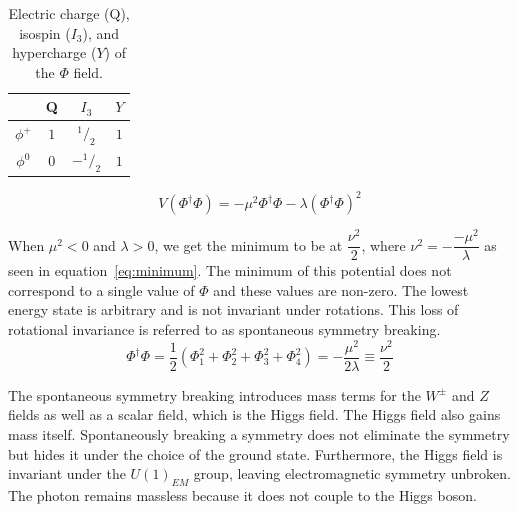 \begin{center}
\begin{table}[htb]
\caption{\small   Electric charge (Q), isospin ($I_{3}$), and hypercharge ($Y$) of the $\Phi$ field.
}
\begin{center}
\begin{tabular}{ c c c c }
\hline     & Q    & $I_{3}$ & $Y$ \\ \hline \hline
$\phi^+$   & $1$  & $^1/_2$  & $1$ \\
$\phi^0$   & $0$  & $-^1/_2$ & $1$ \\ \hline
\hline
\end{tabular}
\end{center}
\label{tab:phi_QuantumNumbers}
\end{table}

\end{center}

\begin{equation} V(\Phi^{\dagger} \Phi) = -\mu^2 \Phi^{\dagger} \Phi - \lambda (\Phi^{\dagger} \Phi)^2 \label{eq:potential}\end{equation}

When $\mu^2 < 0$ and $\lambda > 0$, we get the minimum to be at $\dfrac{\nu^2}{2}$, where $\nu^2 = -\dfrac{-\mu^2}{\lambda}$ as seen in equation~\ref{eq:minimum}.  The minimum of this potential does not correspond to a single value of $\Phi$ and these values are non-zero. The lowest energy state is arbitrary and is not invariant under rotations.  This loss of rotational invariance is referred to as spontaneous symmetry breaking.  
\begin{equation} \Phi^{\dagger} \Phi = \dfrac{1}{2} ( \Phi^2_1 + \Phi^2_2 + \Phi^2_3 + \Phi^2_4) = -\dfrac{\mu^2}{2\lambda} \equiv \dfrac{\nu^2}{2} \label{eq:minimum}\end{equation}

The spontaneous symmetry breaking introduces mass terms for the $W^{\pm}$ and $Z$ fields as well as a scalar field, which is the Higgs field.  The Higgs field also gains mass itself.  Spontaneously breaking a symmetry does not eliminate the symmetry but hides it under the choice of the ground state.  Furthermore, the Higgs field is invariant under the $U(1)_{EM}$ group, leaving electromagnetic symmetry unbroken. The photon remains massless because it does not couple to the Higgs boson.


